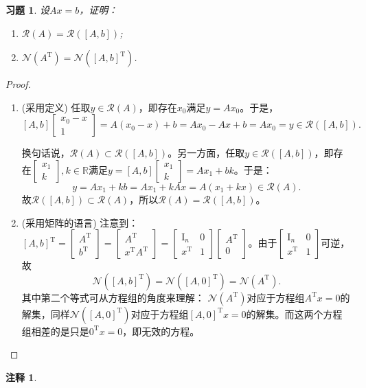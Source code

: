 \documentclass[UTF8]{ctexart}
\newtheorem{ex}[thm]{习题}
\newtheorem{rmk}[thm]{注释}
\begin{document}
\begin{ex}
设$Ax = b$，证明：
\begin{enumerate}
\item
$\mathcal{R}(A) = \mathcal{R}([A, b])$;
\item
$\mathcal{N}(A^\mathrm{T}) = \mathcal{N}([A, b]^{\mathrm{T}})$.
\end{enumerate}
\end{ex}

\begin{proof}
\begin{enumerate}
\item{(采用定义)}
任取$y \in \mathcal{R}(A)$，即存在$x_0$满足$y = Ax_0$。于是，
\[
[A, b] \begin{bmatrix}
x_0 - x \\
1
\end{bmatrix} = A(x_0 - x) + b = Ax_0 - Ax + b = Ax_0 = y \in \mathcal{R}([A, b]).
\]

换句话说，$\mathcal{R}(A) \subset \mathcal{R}([A, b])$。另一方面，任取$ y \in \mathcal{R}([A, b])$，即存在$\begin{bmatrix}
x_1\\
k
\end{bmatrix}, k\in \mathbb{R}$满足$y = [A, b]\begin{bmatrix}
x_1\\
k
\end{bmatrix} = Ax_1 + bk$。于是：
\[
y = Ax_1 + kb = Ax_1 + kAx = A(x_1+kx) \in \mathcal{R}(A).
\]
故$\mathcal{R}([A, b]) \subset \mathcal{R}(A)$，所以$\mathcal{R}(A) = \mathcal{R}([A, b])$。
\item{(采用矩阵的语言)}
注意到：$[A, b]^{\mathrm{T}} = \begin{bmatrix}
A^{\mathrm{T}} \\
b^{\mathrm{T}}
\end{bmatrix} = \begin{bmatrix}
A^{\mathrm{T}} \\
x^{\mathrm{T}}A^{\mathrm{T}}
\end{bmatrix}= \begin{bmatrix}
\mathrm{I}_n  & 0\\
x^{\mathrm{T}} & 1
\end{bmatrix}\begin{bmatrix}
A^{\mathrm{T}} \\
0
\end{bmatrix}$。由于$\begin{bmatrix}
\mathrm{I}_n  & 0\\
x^{\mathrm{T}} & 1
\end{bmatrix}$可逆，故
\[
\mathcal{N}([A, b]^{\mathrm{T}}) = \mathcal{N}([A, 0]^{\mathrm{T}}) = \mathcal{N}(A^\mathrm{T}).
\] 
其中第二个等式可从方程组的角度来理解：
$\mathcal{N}(A^\mathrm{T})$对应于方程组$A^\mathrm{T}x = 0$的解集，同样$\mathcal{N}([A, 0]^{\mathrm{T}})$对应于方程组$[A, 0]^{\mathrm{T}}x = 0$的解集。而这两个方程组相差的是只是$0^{\mathrm{T}}x = 0$，即无效的方程。
\end{enumerate}
\end{proof}
\begin{rmk}
\end{rmk}
\end{document}
